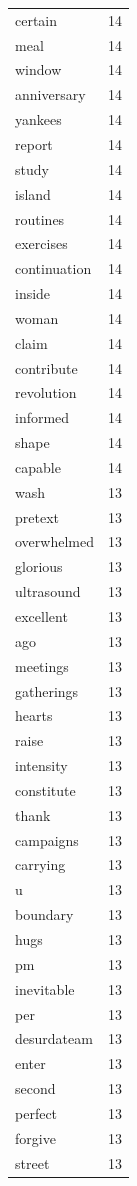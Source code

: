 \begin{tabular}{lr}
certain & 14 \\
meal & 14 \\
window & 14 \\
anniversary & 14 \\
yankees & 14 \\
report & 14 \\
study & 14 \\
island & 14 \\
routines & 14 \\
exercises & 14 \\
continuation & 14 \\
inside & 14 \\
woman & 14 \\
claim & 14 \\
contribute & 14 \\
revolution & 14 \\
informed & 14 \\
shape & 14 \\
capable & 14 \\
wash & 13 \\
pretext & 13 \\
overwhelmed & 13 \\
glorious & 13 \\
ultrasound & 13 \\
excellent & 13 \\
ago & 13 \\
meetings & 13 \\
gatherings & 13 \\
hearts & 13 \\
raise & 13 \\
intensity & 13 \\
constitute & 13 \\
thank & 13 \\
campaigns & 13 \\
carrying & 13 \\
u & 13 \\
boundary & 13 \\
hugs & 13 \\
pm & 13 \\
inevitable & 13 \\
per & 13 \\
desurdateam & 13 \\
enter & 13 \\
second & 13 \\
perfect & 13 \\
forgive & 13 \\
street & 13 \\

\end{tabular}
